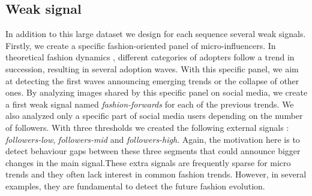 \documentclass{article} %
\begin{document}
\begin{table}
  \caption{Fashion time series overview. For each couple geozone/category, we give the number of female and male trends (Female/Male)}
  \label{sample-table}
  \centering
\end{table}

\subsection{Weak signal}

In addition to this large dataset we design for each sequence several weak signals.  Firstly, we create a specific fashion-oriented panel of micro-influencers. In theoretical fashion dynamics \citep{rogersdiffusion}, different categories of adopters follow a trend in succession, resulting in several adoption waves. With this specific panel, we aim at detecting the first waves announcing emerging trends or the collapse of other ones. By analyzing images shared by this specific panel on social media, we create a first weak signal named \textit{fashion-forwards} for each of the previous trends. We also analyzed only a specific part of social media users depending on the number of followers. With three thresholds we created the following external signals : \textit{followers-low}, \textit{followers-mid} and \textit{followers-high}. Again, the motivation here is to detect behaviour gaps between these three segments that could announce bigger changes in the main signal.These extra signals are frequently sparse for micro trends and they often lack interest in common fashion trends. However, in several examples, they are fundamental to detect the future fashion evolution.
\end{document}
